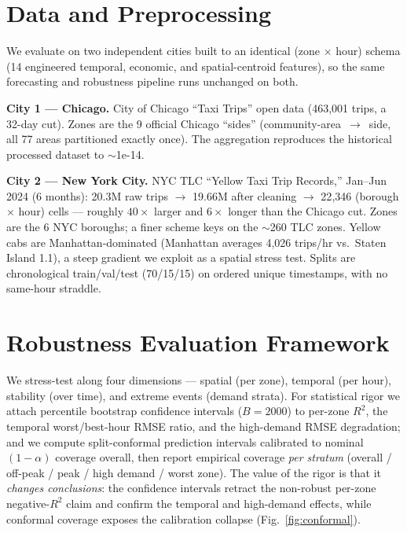 \documentclass[sigconf, review, nonacm]{acmart}
\begin{document}
\section{Data and Preprocessing}
We evaluate on two independent cities built to an identical (zone $\times$ hour) schema (14 engineered
temporal, economic, and spatial-centroid features), so the same forecasting and robustness pipeline
runs unchanged on both.

\textbf{City 1 --- Chicago.} City of Chicago ``Taxi Trips'' open data (463{,}001 trips, a 32-day cut).
Zones are the 9 official Chicago ``sides'' (community-area~$\rightarrow$~side, all 77 areas partitioned
exactly once). The aggregation reproduces the historical processed dataset to $\sim$1e{-}14.

\textbf{City 2 --- New York City.} NYC TLC ``Yellow Taxi Trip Records,'' Jan--Jun 2024 (6 months):
20.3M raw trips $\rightarrow$ 19.66M after cleaning $\rightarrow$ 22{,}346 (borough $\times$ hour) cells
--- roughly $40\times$ larger and $6\times$ longer than the Chicago cut. Zones are the 6 NYC boroughs;
a finer scheme keys on the $\sim$260 TLC zones. Yellow cabs are Manhattan-dominated (Manhattan averages
4{,}026 trips/hr vs.\ Staten Island 1.1), a steep gradient we exploit as a spatial stress test. Splits
are chronological train/val/test (70/15/15) on ordered unique timestamps, with no same-hour straddle.

\section{Robustness Evaluation Framework}\label{sec:robust}
We stress-test along four dimensions --- spatial (per zone), temporal (per hour), stability (over time),
and extreme events (demand strata). For statistical rigor we attach percentile bootstrap confidence
intervals ($B{=}2000$) to per-zone $R^2$, the temporal worst/best-hour RMSE ratio, and the high-demand
RMSE degradation; and we compute split-conformal prediction intervals calibrated to nominal $(1{-}\alpha)$
coverage overall, then report empirical coverage \emph{per stratum} (overall / off-peak / peak / high
demand / worst zone). The value of the rigor is that it \emph{changes conclusions}: the confidence
intervals retract the non-robust per-zone negative-$R^2$ claim and confirm the temporal and high-demand
effects, while conformal coverage exposes the calibration collapse (Fig.~\ref{fig:conformal}).
\end{document}
